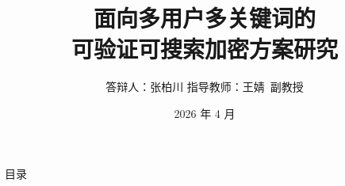 \documentclass[aspectratio=169]{beamer}
\title{面向多用户多关键词的\\可验证可搜索加密方案研究}
\author[张柏川]{答辩人：张柏川 \quad 指导教师：王婧~副教授}
\date{2026 年 4 月}
\institute[HUST]{
  {\fontsize{9pt}{12pt}\selectfont 网络空间安全学院\\}
  \vspace{0.5em}
  {\fontsize{10pt}{12pt}\selectfont 华中科技大学}
}
\begin{document}
\maketitle

\begin{frame}{目\quad 录}
  \tableofcontents
\end{frame}







\end{document}
